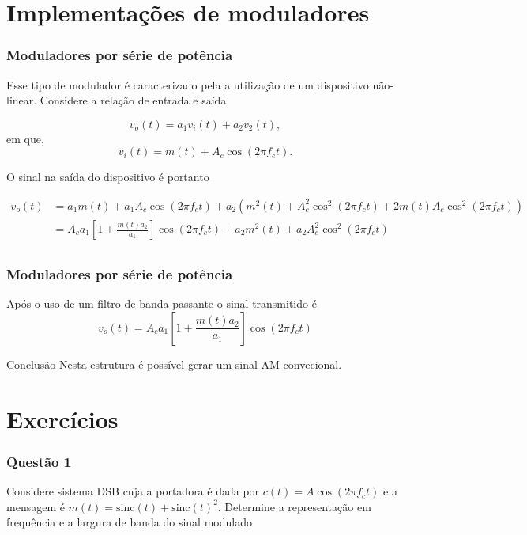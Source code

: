 \documentclass[10pt,hyperref={pdfpagemode=FullScreen},aspectratio=169]{beamer}
\begin{document}
\section{Implementações de moduladores}

\begin{frame}
  \frametitle{Moduladores por série de potência
  }

  Esse tipo de modulador é caracterizado pela a utilização de um dispositivo não-linear. Considere a relação de entrada e saída

$$
v_o(t) = a_1v_i(t) + a_2v_2(t),
$$
em que,
$$
v_i(t) = m(t) +A_c \cos(2\pi f_c t).
$$

O sinal na saída do dispositivo é portanto

\begin {align*}
v_o(t)  &=  a_1m(t) +a_1A_c \cos(2\pi f_c t) + a_2(m^2(t) +A^2_c \cos^2(2\pi f_c t) + 2m(t)A_c \cos^2(2\pi f_c t)) \\
        &=  A_c a_1\left[ 1 + \frac{m(t) a_2}{a_1}\right]\cos(2\pi f_c t) + a_2m^2(t) + a_2A^2_c \cos^2(2\pi f_c t) \\
\end{align*}

\end{frame}


\begin{frame}
  \frametitle{Moduladores por série de potência}

  Após o uso de um filtro de banda-passante o sinal transmitido é 
$$
v_o(t) = A_c a_1\left[ 1 + \frac{m(t) a_2}{a_1}\right]\cos(2\pi f_c t)
$$

\begin{block}{Conclusão}
  Nesta estrutura é possível gerar um sinal AM convecional.
\end{block}

\end{frame}

\section {Exercícios}

\begin{frame}
  \frametitle{Questão 1}

  Considere sistema DSB cuja a portadora é dada por $c(t) = A \cos(2\pi f_c t)$ e a mensagem é $m(t) = \text{sinc}(t) + \text{sinc}(t)^2$. Determine a representação em frequência e a largura de banda do sinal modulado

\end{frame}
\end{document}
